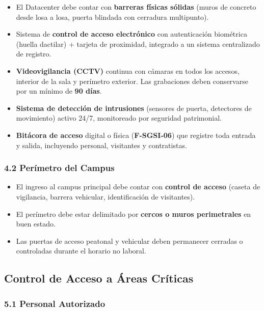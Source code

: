 \documentclass[10pt,letterpaper]{article}
\begin{document}
\begin{itemize}
\tightlist
\item
  El Datacenter debe contar con \textbf{barreras físicas sólidas} (muros
  de concreto desde losa a losa, puerta blindada con cerradura
  multipunto).
\item
  Sistema de \textbf{control de acceso electrónico} con autenticación
  biométrica (huella dactilar) + tarjeta de proximidad, integrado a un
  sistema centralizado de registro.
\item
  \textbf{Videovigilancia (CCTV)} continua con cámaras en todos los
  accesos, interior de la sala y perímetro exterior. Las grabaciones
  deben conservarse por un mínimo de \textbf{90 días}.
\item
  \textbf{Sistema de detección de intrusiones} (sensores de puerta,
  detectores de movimiento) activo 24/7, monitoreado por seguridad
  patrimonial.
\item
  \textbf{Bitácora de acceso} digital o física (\textbf{F-SGSI-06}) que
  registre toda entrada y salida, incluyendo personal, visitantes y
  contratistas.
\end{itemize}

\subsubsection{4.2 Perímetro del Campus}\label{peruxedmetro-del-campus}

\begin{itemize}
\tightlist
\item
  El ingreso al campus principal debe contar con \textbf{control de
  acceso} (caseta de vigilancia, barrera vehicular, identificación de
  visitantes).
\item
  El perímetro debe estar delimitado por \textbf{cercos o muros
  perimetrales} en buen estado.
\item
  Las puertas de acceso peatonal y vehicular deben permanecer cerradas o
  controladas durante el horario no laboral.
\end{itemize}

\subsection{Control de Acceso a Áreas
Críticas}\label{control-de-acceso-a-uxe1reas-cruxedticas}

\subsubsection{5.1 Personal Autorizado}\label{personal-autorizado}
\end{document}
